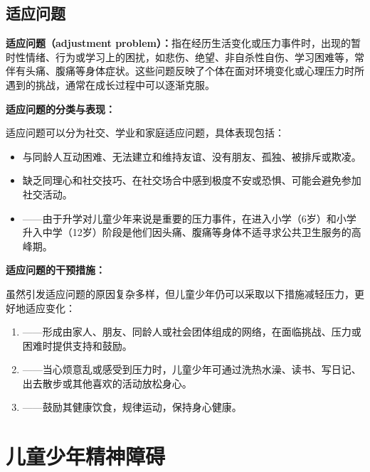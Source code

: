\subsection{适应问题}

\begin{defbox}
\textbf{适应问题（adjustment problem）：}指在经历生活变化或压力事件时，出现的暂时性情绪、行为或学习上的困扰，如悲伤、绝望、非自杀性自伤、学习困难等，常伴有头痛、腹痛等身体症状。这些问题反映了个体在面对环境变化或心理压力时所遇到的挑战，通常在成长过程中可以逐渐克服。
\end{defbox}

\begin{keybox}
\textbf{适应问题的分类与表现：}

适应问题可以分为社交、学业和家庭适应问题，具体表现包括：

\begin{itemize}[leftmargin=*]
    \item 与同龄人互动困难、无法建立和维持友谊、没有朋友、孤独、被排斥或欺凌。
    \item 缺乏同理心和社交技巧、在社交场合中感到极度不安或恐惧、可能会避免参加社交活动。
    \item {}——由于升学对儿童少年来说是重要的压力事件，在进入小学（6岁）和小学升入中学（12岁）阶段是他们因头痛、腹痛等身体不适寻求公共卫生服务的高峰期。
\end{itemize}
\end{keybox}

\begin{tipbox}
\textbf{适应问题的干预措施：}

虽然引发适应问题的原因复杂多样，但儿童少年仍可以采取以下措施减轻压力，更好地适应变化：

\begin{enumerate}[leftmargin=*]
    \item {}——形成由家人、朋友、同龄人或社会团体组成的网络，在面临挑战、压力或困难时提供支持和鼓励。
    \item {}——当心烦意乱或感受到压力时，儿童少年可通过洗热水澡、读书、写日记、出去散步或其他喜欢的活动放松身心。
    \item {}——鼓励其健康饮食，规律运动，保持身心健康。
\end{enumerate}
\end{tipbox}

\section{儿童少年精神障碍}

